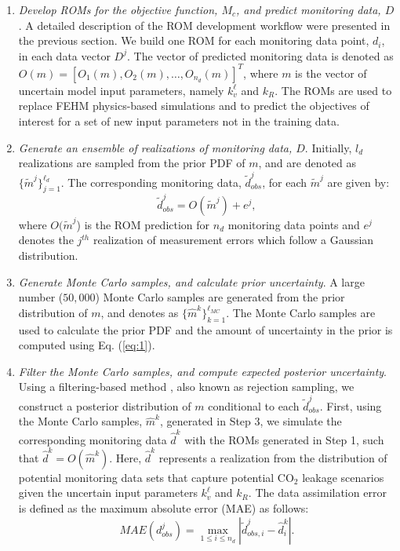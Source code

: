 \documentclass[a4paper,fleqn]{cas-sc}
\begin{document}
\begin{enumerate}[Step 1.]
\item \textit{Develop ROMs for the objective function, $M_c$, and predict monitoring data, $D$}. A detailed description of the ROM development workflow were presented in the previous section. We build one ROM for each monitoring data point, $d_i$, in each data vector $D^j$. The vector of predicted monitoring data is denoted as $O(m)=[O_1(m), O_2(m), \ldots,O_{n_d}(m)]^T$, where $m$ is the vector of uncertain model input parameters, namely $k_v^\ell$ and $k_R$. The ROMs are used to replace FEHM physics-based simulations and to predict the objectives of interest for a set of new input parameters not in the training data.

\item \textit{Generate an ensemble of realizations of monitoring data, $D$}. Initially, $l_d$ realizations are sampled from the prior PDF of $m$, and are denoted as $ \{\widetilde{m}^j\}_{j=1}^{\ell_d}$. The corresponding monitoring data, $\widetilde{d}_{obs}^j$, for each $\widetilde{m}^j$ are given by:
\begin{equation} \label{eq:4}
    \widetilde{d}_{obs}^j = O(\widetilde{m}^j) + e^j ,
\end{equation}
where $O(\widetilde{m}^j$) is the ROM prediction for $n_d$ monitoring data points and $e^j$ denotes the $j^{th}$ realization of measurement errors which follow a Gaussian distribution.

\item \textit{Generate Monte Carlo samples, and calculate prior uncertainty}. A large number ($50,000$) Monte Carlo samples are generated from the prior distribution of $m$, and denotes as $\{\hat{m}^k\}_{k=1}^{\ell_{MC}}$. The Monte Carlo samples are used to calculate the prior PDF and the amount of uncertainty in the prior is computed using Eq. (\ref{eq:1}).

\item \textit{Filter the Monte Carlo samples, and compute expected posterior uncertainty}. Using a filtering-based method \citep{Caers2011}, also known as rejection sampling, we construct a posterior distribution of $m$ conditional to each $\widetilde{d}_{obs}^j$. First, using the Monte Carlo samples, $\hat{m}^k$, generated in Step 3, we simulate the corresponding monitoring data $\hat{d}^k$ with the ROMs generated in Step 1, such that $\hat{d}^k=O(\hat{m}^k)$. Here, $\hat{d}^k$ represents a realization from the distribution of potential monitoring data sets that capture potential CO$_2$ leakage scenarios given the uncertain input parameters $k_v^\ell$ and $k_R$. The data assimilation error is defined as the maximum absolute error (MAE) as follows:
\begin{equation} \label{eq:5}
    MAE(d^j_{obs}) = \max\limits_{1\leq i \leq n_d} | \widetilde{d}^j_{obs,i} - \hat{d}^k_i | .
\end{equation}


\end{enumerate}
\end{document}
